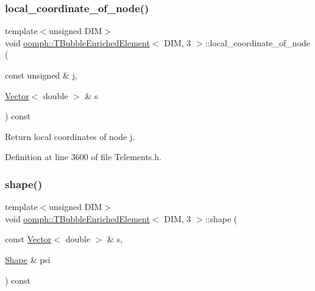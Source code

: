 \subsubsection{\texorpdfstring{local\+\_\+coordinate\+\_\+of\+\_\+node()}{local\_coordinate\_of\_node()}}
{\footnotesize\ttfamily template$<$unsigned D\+IM$>$ \\
void \hyperlink{classoomph_1_1TBubbleEnrichedElement}{oomph\+::\+T\+Bubble\+Enriched\+Element}$<$ D\+IM, 3 $>$\+::local\+\_\+coordinate\+\_\+of\+\_\+node (\begin{DoxyParamCaption}\item[{const unsigned \&}]{j,  }\item[{\hyperlink{classoomph_1_1Vector}{Vector}$<$ double $>$ \&}]{s }\end{DoxyParamCaption}) const\hspace{0.3cm}{\ttfamily [inline]}}



Return local coordinates of node j. 



Definition at line 3600 of file Telements.\+h.

\mbox{\label{classoomph_1_1TBubbleEnrichedElement_3_01DIM_00_013_01_4_a874e11ea0e72ee05ac9de81e3ba7fe97}} 
\subsubsection{\texorpdfstring{shape()}{shape()}}
{\footnotesize\ttfamily template$<$unsigned D\+IM$>$ \\
void \hyperlink{classoomph_1_1TBubbleEnrichedElement}{oomph\+::\+T\+Bubble\+Enriched\+Element}$<$ D\+IM, 3 $>$\+::shape (\begin{DoxyParamCaption}\item[{const \hyperlink{classoomph_1_1Vector}{Vector}$<$ double $>$ \&}]{s,  }\item[{\hyperlink{classoomph_1_1Shape}{Shape} \&}]{psi }\end{DoxyParamCaption}) const\hspace{0.3cm}{\ttfamily [inline]}}



